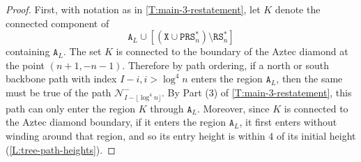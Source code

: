 \documentclass[11pt,twoside]{amsart}
\theoremstyle{plain}
\numberwithin{quest}{section}
\theoremstyle{remark}
\numberwithin{rem}{section}
\theoremstyle{definition}
\newcommand{\cN}{\mathcal{N}}
\renewcommand{\tt}[1]{{\mathtt{#1}}}
\begin{document}
	\begin{proof}
	First, with notation as in \cref{T:main-3-restatement}, let $K$ denote the connected component of
	$$
	\tt{A}_L \cup [(\tt{X} \cup \tt{PRS}^*_n)\setminus \tt{RS}^*_n]
	$$
	containing $\tt{A}_L$. The set $K$ is connected to the boundary of the Aztec diamond at the point $(n + 1, -n -1)$. Therefore by path ordering, if a north or south backbone path with index $I -i, i  > \log^4 n$ enters the region $\tt{A}_L$, then the same must be true of the path $\cN_{I - \lfloor \log^4 n \rfloor}^-$. By Part (3) of \cref{T:main-3-restatement}, this path can only enter the region $K$ through $\tt{A}_L$. Moreover, since $K$ is connected to the Aztec diamond boundary, if it enters the region $\tt{A}_L$, it first enters without winding around that region, and so its entry height is within $4$ of its initial height (\cref{L:tree-path-heights}). 
	

\end{proof}
\end{document}
